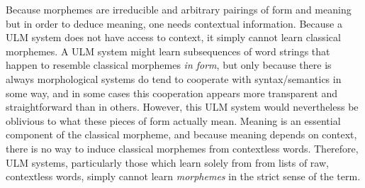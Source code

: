 Because morphemes are irreducible and arbitrary pairings of form and meaning
but in order to deduce meaning, one needs contextual information. Because
a \ac{ULM} system does not have access to context, it simply 
cannot learn classical morphemes. A \ac{ULM} system might learn 
subsequences of word strings that happen to resemble
 classical morphemes \emph{in form}, but only because there is always 
 morphological systems do tend to cooperate with syntax/semantics in some way, and in some 
 cases this cooperation appears more transparent and straightforward than
 in others.  However, this \ac{ULM} system would nevertheless be oblivious to what
 these pieces of form actually mean. Meaning is an essential component of the classical morpheme, and because
 meaning depends on context, there is no way to induce classical morphemes from contextless words.
Therefore, \ac{ULM} systems, particularly those which learn solely from 
from lists of raw, contextless words, simply cannot learn 
\emph{morphemes} in the strict sense of the term.

